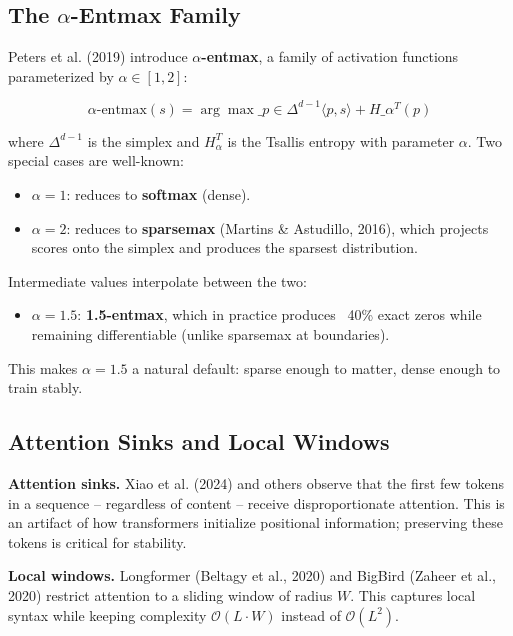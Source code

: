 \subsection{The $\alpha$-Entmax Family}

Peters et al. (2019) introduce \textbf{$\alpha$-entmax}, a family of activation functions 
parameterized by $\alpha \in [1, 2]$:

\[
\text{$\alpha$-entmax}(s) = \arg\max\_{p \in \Delta^{d-1}} \langle p, s \rangle + H\_\alpha^T(p)
\tag{1.2}
\]

where $\Delta^{d-1}$ is the simplex and $H_\alpha^T$ is the Tsallis entropy 
with parameter $\alpha$. Two special cases are well-known:

\begin{itemize}
\item $\alpha = 1$: reduces to \textbf{softmax} (dense).
\item $\alpha = 2$: reduces to \textbf{sparsemax} (Martins \& Astudillo, 2016),
  which projects scores onto the simplex and produces the sparsest
  distribution.

\end{itemize}
Intermediate values interpolate between the two:

\begin{itemize}
\item $\alpha = 1.5$: \textbf{1.5-entmax}, which in practice produces ~40\% exact zeros
  while remaining differentiable (unlike sparsemax at boundaries).

\end{itemize}
This makes $\alpha = 1.5$ a natural default: sparse enough to matter, dense 
enough to train stably.

\subsection{Attention Sinks and Local Windows}

\textbf{Attention sinks.} Xiao et al. (2024) and others observe that the first 
few tokens in a sequence -- regardless of content -- receive disproportionate 
attention. This is an artifact of how transformers initialize positional 
information; preserving these tokens is critical for stability.

\textbf{Local windows.} Longformer (Beltagy et al., 2020) and BigBird (Zaheer et al., 
2020) restrict attention to a sliding window of radius $W$. This captures 
local syntax while keeping complexity $\mathcal{O}(L \cdot W)$ instead of 
$\mathcal{O}(L^2)$.

